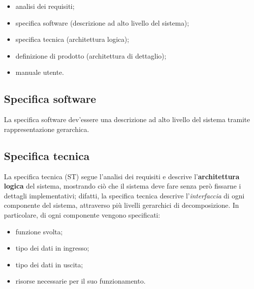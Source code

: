 \documentclass[a4paper]{article}
\begin{document}
	\begin{itemize}
		
			
	\item analisi dei requisiti;
			
	\item specifica software (descrizione ad alto livello del sistema);
			
	\item specifica tecnica (architettura logica);
			
	\item definizione di prodotto (architettura di dettaglio);
			
	\item manuale utente.
		
	\end{itemize}




		
	\subsection{Specifica software}

		
La specifica software dev'essere una descrizione ad alto livello del sistema tramite rappresentazione gerarchica.

		
	\subsection{Specifica tecnica}

		
La specifica tecnica (ST) segue l'analisi dei requisiti e descrive l'\textbf{architettura logica} del sistema, mostrando ciò che il sistema deve fare senza però fissarne i dettagli implementativi; difatti, la specifica tecnica descrive l'\emph{interfaccia} di ogni componente del sistema, attraverso più livelli gerarchici di decomposizione. In particolare, di ogni componente vengono specificati:
		
	\begin{itemize}
		
			
	\item funzione svolta;
			
	\item tipo dei dati in ingresso;
			
	\item tipo dei dati in uscita;
			
	\item risorse necessarie per il suo funzionamento.
		
	\end{itemize}
\end{document}
